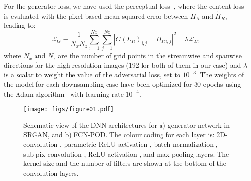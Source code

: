 For the generator loss, we have used the perceptual loss~\citep{ledig2017photo}, where the content loss is evaluated with the pixel-based mean-squared error between $H_R$ and $\widetilde{H}_{R}$, leading to:
\begin{equation}
    \mathcal{L}_G=\frac{1}{N_xN_z}\sum^{Nx}_{i=1}\sum^{Nz}_{j=1}|G(L_R)_{i,j} - H_R{_{i,j}}|^2 - \lambda \mathcal{L}_D,
\end{equation}
\noindent where $N_x$ and $N_z$ are the number of grid points in the streamwise and spanwise directions for the high-resolution images (192 for both of them in our case) and $\lambda$ is a scalar to weight the value of the adversarial loss, set to $10^{-3}$.
The weights of the model for each downsampling case have been optimized for 30 epochs using the Adam algorithm~\citep{kingma2014adam} with learning rate $10^{-4}$.
\begin{figure}
  \centerline{
  \texttt{[image: figs/figure01.pdf]}}
  \caption{Schematic view of the DNN architectures for a) generator network in SRGAN, and b) FCN-POD. The colour coding for each layer is: 2D-convolution , parametric-ReLU-activation , batch-normalization , sub-pix-convolution , ReLU-activation , and max-pooling  layers. The kernel size and the number of filters are shown at the bottom of the convolution layers.}
\label{fig:01}
\end{figure}


